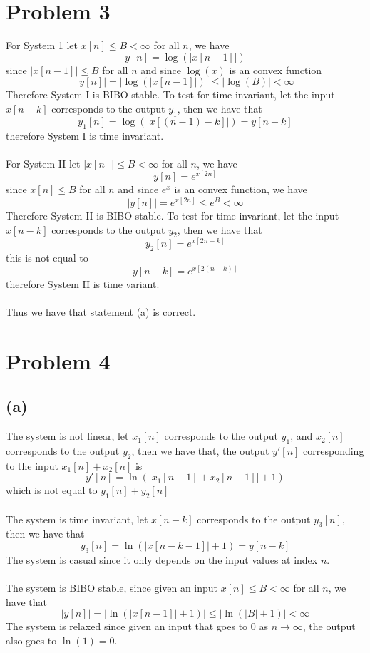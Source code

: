 \section*{Problem 3}
For System 1 let $x[n]\leq B <\infty$ for all $n$, we have
$$y[n]=\log(|x[n-1]|)$$
since $|x[n-1]|\leq B$ for all $n$ and since $\log(x)$ is an convex function
$$|y[n]|=|\log(|x[n-1]|)|\leq |\log(B)|<\infty$$
Therefore System I is BIBO stable. To test for time invariant, let 
the input $x[n-k]$ corresponds to the output $y_1$, then we have that
$$y_1[n]=\log(|x[(n-1)-k]|)=y[n-k]$$
therefore System I is time invariant.\\\\
For System II let $|x[n]|\leq B <\infty$ for all $n$, we have
$$y[n]=e^{x[2n]}$$
since $x[n]\leq B$ for all $n$ and since $e^x$ is an convex function, we have
$$|y[n]|=e^{x[2n]}\leq e^B<\infty$$
Therefore System II is BIBO stable. To test for time invariant, let
the input $x[n-k]$ corresponds to the output $y_2$, then we have that
$$y_2[n]=e^{x[2n-k]}$$
this is not equal to 
$$y[n-k]=e^{x[2(n-k)]}$$
therefore System II is time variant.\\\\
Thus we have that statement (a) is correct.
\section*{Problem 4}
\subsection*{(a)}
The system is not linear, let 
$x_1[n]$ corresponds to the output $y_1$, and $x_2[n]$ corresponds to the output $y_2$, then we have that, 
the output $y'[n]$ corresponding to the input $x_1[n]+x_2[n]$ is
$$y'[n]=\ln(|x_1[n-1]+x_2[n-1]|+1)$$
which is not equal to $y_1[n]+y_2[n]$\\\\
The system is time invariant, let $x[n-k]$ corresponds to the output $y_3[n]$, then we have that
$$y_3[n]=\ln(|x[n-k-1]|+1)=y[n-k]$$
The system is casual since it only depends on the input values at index $n$.\\\\
The system is BIBO stable, since given an input $x[n]\leq B<\infty$ for all $n$, we have that
$$|y[n]|=|\ln(|x[n-1]|+1)|\leq |\ln(|B|+1)|<\infty$$
The system is relaxed since given an input that goes to $0$ as $n\to\infty$, the output
also goes to $\ln(1)=0$.
